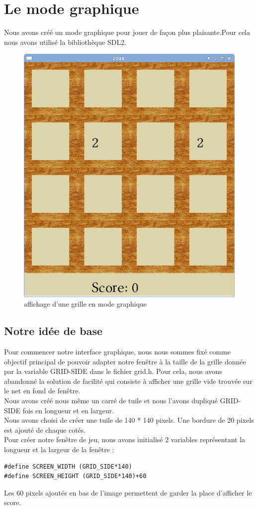 \documentclass{report}
\begin{document}
\chapter{Le mode graphique}
Nous avons créé un mode graphique pour jouer de façon plus plaisante.Pour cela nous avons utilisé la bibliothèque SDL2.
\begin{figure}[hbtp]
\caption{affichage d'une grille en mode graphique}
\centering
\includegraphics[scale=0.3]{modegraphique.png}
\end{figure}
\section{Notre idée de base}
Pour commencer notre interface graphique, nous nous sommes fixé comme objectif principal de pouvoir adapter notre fenêtre à la taille de la grille donnée par la variable GRID-SIDE dans le fichier grid.h. Pour cela, nous avons abandonné la solution de facilité qui consiste à afficher une grille vide trouvée sur le net en fond de fenêtre.\\
Nous avons créé nous même un carré de tuile et nous l'avons dupliqué GRID-SIDE fois en longueur et en largeur.\\
Nous avons choisi de créer une tuile de 140 * 140 pixels. Une bordure de 20 pixels est ajouté de chaque cotés.\\
Pour créer notre fenêtre de jeu, nous avons initialisé 2 variables représentant la longueur et la largeur de la fenêtre :
\begin{lstlisting}[frame=single]
#define SCREEN_WIDTH (GRID_SIDE*140)
#define SCREEN_HEIGHT (GRID_SIDE*140)+60
\end{lstlisting}
Les 60 pixels ajoutés en bas de l'image permettent de garder la place d'afficher le score.\\
\end{document}
